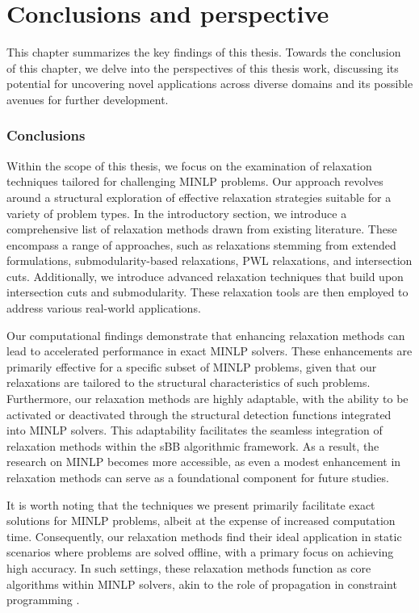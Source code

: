\chapter{Conclusions and perspective}
\label{chap.con}


This chapter summarizes the key findings of this thesis. Towards the conclusion of this chapter, we delve into the perspectives of this thesis work, discussing its potential for uncovering novel applications across diverse domains and its possible avenues for further development.


\subsection{Conclusions}

Within the scope of this thesis, we focus on the examination of relaxation techniques tailored for challenging MINLP problems. Our approach revolves around a structural exploration of effective relaxation strategies suitable for a variety of problem types. In the introductory section, we introduce a comprehensive list of relaxation methods drawn from existing literature. These encompass a range of approaches, such as relaxations stemming from extended formulations, submodularity-based relaxations, PWL relaxations, and intersection cuts. Additionally, we introduce advanced relaxation techniques that build upon intersection cuts and submodularity. These relaxation tools are then employed to address various real-world applications.




Our computational findings demonstrate that enhancing relaxation methods can lead to accelerated performance in exact MINLP solvers. These enhancements are primarily effective for a specific subset of MINLP problems, given that our relaxations are tailored to the structural characteristics of such problems. Furthermore, our relaxation methods are highly adaptable, with the ability to be activated or deactivated through the structural detection functions integrated into MINLP solvers. This adaptability facilitates the seamless integration of relaxation methods within the sBB algorithmic framework. As a result, the research on MINLP becomes more accessible, as even a modest enhancement in relaxation methods can serve as a foundational component for future studies.




It is worth noting that the techniques we present primarily facilitate exact solutions for MINLP problems, albeit at the expense of increased computation time. Consequently, our relaxation methods find their ideal application in static scenarios where problems are solved offline, with a primary focus on achieving high accuracy. In such settings, these relaxation methods function as core algorithms within MINLP solvers, akin to the role of propagation in constraint programming \cite{achterberg2008constraint}. 

